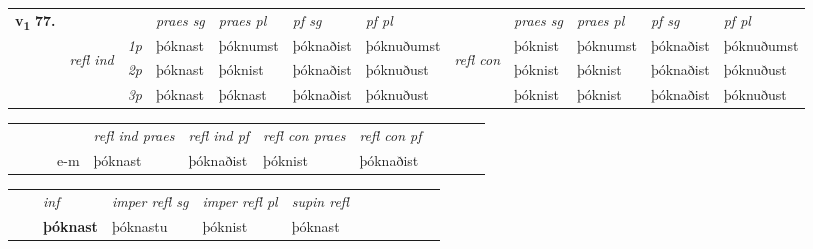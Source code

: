 \begin{tabular}{llllllllllll} \toprule
\multirow{4}{*}{{{\textbf{v{\textsubscript{1}}} \Large{\textbf{77.}}}}}  & &   &  \textit{praes sg}  & \textit{praes pl}  &\textit{pf sg} & \textit{pf pl} &  &  \textit{praes sg}  & \textit{praes pl}  & \textit{pf sg} & \textit{pf pl } \\*
	\cmidrule{4-7} \cmidrule{9-12}
 &\multirow{3}{*}{\begin{turn}{90}\textit{refl ind}\end{turn}} & {\textit{1p}} & þóknast & þóknumst    & þóknaðist & þóknuðumst & \multirow{3}{*}{\begin{turn}{90}\textit{refl con}\end{turn}}  &þóknist & þóknumst & þóknaðist & þóknuðumst\\*
 &&  {\textit{2p}} &  þóknast  & þóknist   & þóknaðist & þóknuðust & &þóknist & þóknist & þóknaðist & þóknuðust \\*
& &  {\textit{3p}} & þóknast & þóknast   & þóknaðist & þóknuðust & & þóknist & þóknist& þóknaðist & þóknuðust  \\*
\cmidrule{4-7} \cmidrule{9-12}
\end{tabular}


\begin{tabular}{llllllllllll}
 & &  & &  \textit{refl ind praes} & \textit{refl ind pf} & \textit{refl con praes} & \textit{refl con pf} \\*
&  & & e-m & þóknast & þóknaðist & þóknist & þóknaðist \\*
\cmidrule{5-9}
\end{tabular}


\begin{tabular}{llllllllllll}
 & & \textit{inf}   & \textit{imper refl sg} & \textit{imper refl pl}   & \textit{supin refl}      \\*
  & & \textbf{þóknast}    & þóknastu & þóknist   & þóknast  \\*
\cmidrule{1-12}
\end{tabular}




